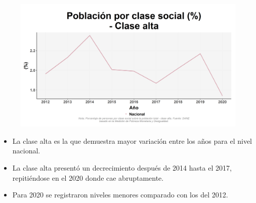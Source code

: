     \begin{figure}[H]
        \caption[Población por clase social - Clase alta a nivel nacional ]{\label{clase_alta_nacional} }
        \begin{center}
        \includegraphics[width=\textwidth,keepaspectratio]{img/var_251_trend.png}
        \end{center}
    \end{figure}
            \begin{itemize}
                    \item La clase alta es la que demuestra mayor variación entre los años para el nivel nacional.
                    \item La clase alta presentó un decrecimiento después de 2014 hasta el 2017, repitiéndose en el 2020 donde cae abruptamente.
                    \item Para 2020 se registraron niveles menores comparado con los del 2012.
                    \end{itemize}

